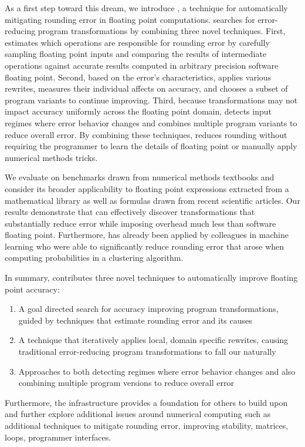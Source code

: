 \documentclass[paper.tex]{subfiles}
\begin{document}
As a first step toward this dream, we introduce \casio,
  a technique for automatically mitigating rounding error
  in floating point computations.
\casio searches for error-reducing program
transformations by combining three novel techniques.  First, \casio
estimates which operations are responsible for rounding error by
carefully sampling floating point inputs and comparing the results of
intermediate operations against accurate results computed in arbitrary
precision software floating point.  Second, based on the error's
characteristics, \casio applies various rewrites, measures their
individual affects on accuracy, and chooses a subset of program
variants to continue improving.  Third, because transformations may
not impact accuracy uniformly across the floating point domain, \casio
detects input regimes where error behavior changes and combines
multiple program variants to reduce overall error.  By combining these
techniques, \casio reduces rounding without requiring the programmer
to learn the details of floating point or manually apply numerical
methods tricks.

We evaluate \casio on benchmarks drawn from numerical methods
textbooks and consider its broader applicability to floating point
expressions extracted from a mathematical library as well as formulas
drawn from recent scientific articles.  Our results demonstrate that
\casio can effectively discover transformations that substantially
reduce error while imposing overhead much less than software floating
point.  Furthermore, \casio has already been applied by colleagues in
machine learning who were able to significantly reduce rounding error
that arose when computing probabilities in a clustering algorithm.

In summary, \casio contributes three novel techniques to automatically
improve floating point accuracy:
\begin{enumerate}
\item A goal directed search for accuracy improving program
  transformations, guided by techniques that estimate rounding error
  and its causes
\item A technique that iteratively applies local, domain specific
  rewrites, causing traditional error-reducing program transformations
  to fall our naturally
\item Approaches to both detecting regimes where error behavior
  changes and also combining multiple program versions to reduce
  overall error
\end{enumerate}
Furthermore, the \casio infrastructure provides a foundation for
others to build upon and further explore additional issues around
numerical computing such as additional techniques to mitigate rounding
error, improving stability, matrices, loops, programmer interfaces.
\end{document}
